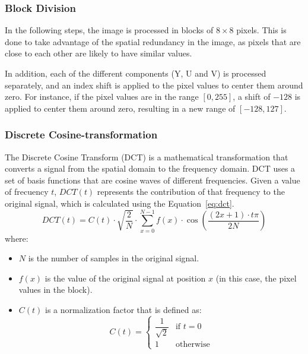 \subsubsection{Block Division}

In the following steps, the image is processed in blocks of $8\times 8$ pixels. This is done to take advantage of the spatial redundancy in the image, as pixels that are close to each other are likely to have similar values.

In addition, each of the different components (Y, U and V) is processed separately, and an index shift is applied to the pixel values to center them around zero. For instance, if the pixel values are in the range $[0, 255]$, a shift of $-128$ is applied to center them around zero, resulting in a new range of $[-128, 127]$.

\subsubsection{Discrete Cosine-transformation}

The Discrete Cosine Transform (DCT) is a mathematical transformation that converts a signal from the spatial domain to the frequency domain. DCT uses a set of basis functions that are cosine waves of different frequencies. Given a value of frecuency $t$, $DCT(t)$ represents the contribution of that frequency to the original signal, which is calculated using the Equation~\ref{eq:dct}.
\begin{equation}
    DCT(t) = C(t)\cdot \sqrt{\dfrac{2}{N}}\cdot \sum_{x=0}^{N-1} f(x)\cdot \cos\left(\dfrac{(2x+1)\cdot t \pi}{2N}\right)
    \label{eq:dct}
\end{equation}
where:
\begin{itemize}
    \item $N$ is the number of samples in the original signal.
    \item $f(x)$ is the value of the original signal at position $x$ (in this case, the pixel values in the block).
    \item $C(t)$ is a normalization factor that is defined as:
    \begin{equation*}
        C(t) = \begin{cases}
            \dfrac{1}{\sqrt{2}} & \text{if } t=0 \\[10pt]
            1 & \text{otherwise}
        \end{cases}
    \end{equation*}
\end{itemize}

